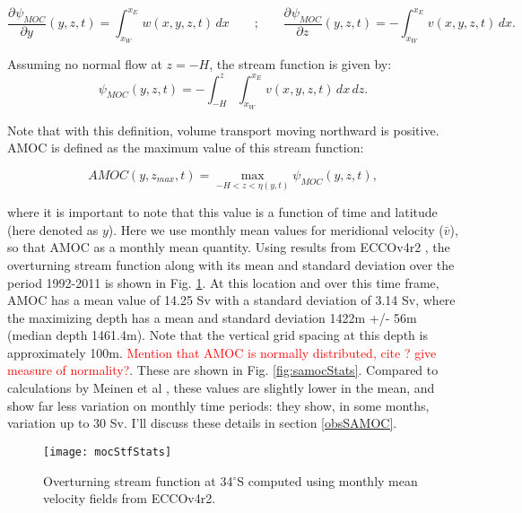 \documentclass[a4paper,11pt]{article}
\newcommand{\pderiv}[3][]{%
  \ensuremath{\frac{\partial^{#1} {#2}}{\partial {#3}^{#1}}}}
\newcommand{\red}[1]{\textcolor{red}{#1}}
\newcommand{\degSym}{$^{\circ}$}
\begin{document}
    \begin{equation}
      \pderiv[]{\psi_{MOC}}{y}(y,z,t) = \int_{x_W}^{x_E}w(x,y,z,t)\,dx \qquad\text{;}\qquad \pderiv[]{\psi_{MOC}}{z}(y,z,t) = -\int_{x_W}^{x_E}v(x,y,z,t)\,dx .
     \label{eq:mocStf}
    \end{equation}

   Assuming no normal flow at $z = -H$, the stream function is given by:
   \begin{equation}
    \psi_{MOC}(y,z,t) = -\int_{-H}^{z}\int_{x_W}^{x_E}v(x,y,z,t)\,dx\,dz .
    \label{eq:mocStf2}
   \end{equation}

   Note that with this definition, volume transport moving northward is positive. AMOC is defined as the maximum value of this stream function: 
   
   \begin{equation}
    AMOC(y,z_{max},t) = \max_{-H < z < \eta(y,t)}{\psi_{MOC}(y,z,t)} ,
    \label{eq:amoc}
   \end{equation}

   where it is important to note that this value is a function of time and latitude (here denoted as $y$). Here we use monthly mean values for meridional velocity ($\bar{v}$), so that AMOC as a monthly mean quantity. Using results from ECCOv4r2 \cite{forgetEccov4}, the overturning stream function along with its mean and standard deviation over the period 1992-2011 is shown in Fig. \ref{fig:mocStfStats}. At this location and over this time frame, AMOC has a mean value of 14.25 Sv with a standard deviation of 3.14 Sv, where the maximizing depth has a mean and standard deviation 1422m +/- 56m (median depth 1461.4m). Note that the vertical grid spacing at this depth is approximately 100m. \red{Mention that AMOC is normally distributed, cite \cite{wunschAndHeimbach_AMOC}? give measure of normality?}. These are shown in Fig. \ref{fig:samocStats}. Compared to calculations by Meinen et al \cite{meinenSamoc}, these values are slightly lower in the mean, and show far less variation on monthly time periods: they show, in some months, variation up to 30 Sv. I'll discuss these details in section \ref{obsSAMOC}. 

   
   \begin{figure}
    \centering
    \texttt{[image: mocStfStats]}
    \caption{Overturning stream function at 34\degSym S computed using monthly mean velocity fields from ECCOv4r2.}
    \label{fig:mocStfStats}
   \end{figure}
   
\end{document}
